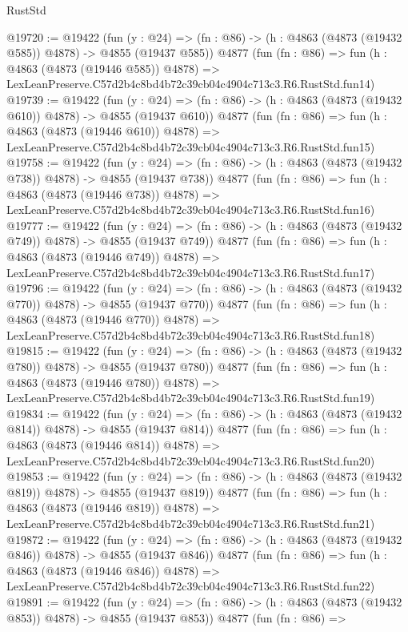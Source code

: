\begin{lexlean}{RustStd}
\begin{coremodule}
@19720 := @19422
    (fun (y : @24) => (fn : @86) -> (h : @4863 (@4873 (@19432 @585)) @4878) -> @4855 (@19437 @585))
    @4877
    (fun (fn : @86) =>
    fun (h : @4863 (@4873 (@19446 @585)) @4878) =>
    LexLeanPreserve.C57d2b4c8bd4b72c39cb04c4904c713c3.R6.RustStd.fun14)
@19739 := @19422
    (fun (y : @24) => (fn : @86) -> (h : @4863 (@4873 (@19432 @610)) @4878) -> @4855 (@19437 @610))
    @4877
    (fun (fn : @86) =>
    fun (h : @4863 (@4873 (@19446 @610)) @4878) =>
    LexLeanPreserve.C57d2b4c8bd4b72c39cb04c4904c713c3.R6.RustStd.fun15)
@19758 := @19422
    (fun (y : @24) => (fn : @86) -> (h : @4863 (@4873 (@19432 @738)) @4878) -> @4855 (@19437 @738))
    @4877
    (fun (fn : @86) =>
    fun (h : @4863 (@4873 (@19446 @738)) @4878) =>
    LexLeanPreserve.C57d2b4c8bd4b72c39cb04c4904c713c3.R6.RustStd.fun16)
@19777 := @19422
    (fun (y : @24) => (fn : @86) -> (h : @4863 (@4873 (@19432 @749)) @4878) -> @4855 (@19437 @749))
    @4877
    (fun (fn : @86) =>
    fun (h : @4863 (@4873 (@19446 @749)) @4878) =>
    LexLeanPreserve.C57d2b4c8bd4b72c39cb04c4904c713c3.R6.RustStd.fun17)
@19796 := @19422
    (fun (y : @24) => (fn : @86) -> (h : @4863 (@4873 (@19432 @770)) @4878) -> @4855 (@19437 @770))
    @4877
    (fun (fn : @86) =>
    fun (h : @4863 (@4873 (@19446 @770)) @4878) =>
    LexLeanPreserve.C57d2b4c8bd4b72c39cb04c4904c713c3.R6.RustStd.fun18)
@19815 := @19422
    (fun (y : @24) => (fn : @86) -> (h : @4863 (@4873 (@19432 @780)) @4878) -> @4855 (@19437 @780))
    @4877
    (fun (fn : @86) =>
    fun (h : @4863 (@4873 (@19446 @780)) @4878) =>
    LexLeanPreserve.C57d2b4c8bd4b72c39cb04c4904c713c3.R6.RustStd.fun19)
@19834 := @19422
    (fun (y : @24) => (fn : @86) -> (h : @4863 (@4873 (@19432 @814)) @4878) -> @4855 (@19437 @814))
    @4877
    (fun (fn : @86) =>
    fun (h : @4863 (@4873 (@19446 @814)) @4878) =>
    LexLeanPreserve.C57d2b4c8bd4b72c39cb04c4904c713c3.R6.RustStd.fun20)
@19853 := @19422
    (fun (y : @24) => (fn : @86) -> (h : @4863 (@4873 (@19432 @819)) @4878) -> @4855 (@19437 @819))
    @4877
    (fun (fn : @86) =>
    fun (h : @4863 (@4873 (@19446 @819)) @4878) =>
    LexLeanPreserve.C57d2b4c8bd4b72c39cb04c4904c713c3.R6.RustStd.fun21)
@19872 := @19422
    (fun (y : @24) => (fn : @86) -> (h : @4863 (@4873 (@19432 @846)) @4878) -> @4855 (@19437 @846))
    @4877
    (fun (fn : @86) =>
    fun (h : @4863 (@4873 (@19446 @846)) @4878) =>
    LexLeanPreserve.C57d2b4c8bd4b72c39cb04c4904c713c3.R6.RustStd.fun22)
@19891 := @19422
    (fun (y : @24) => (fn : @86) -> (h : @4863 (@4873 (@19432 @853)) @4878) -> @4855 (@19437 @853))
    @4877
    (fun (fn : @86) =>

\end{coremodule}
\end{lexlean}

